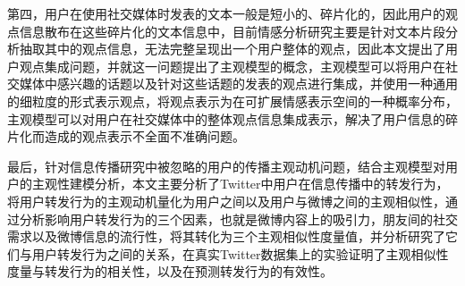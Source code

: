 第四，用户在使用社交媒体时发表的文本一般是短小的、碎片化的，因此用户的观点信息散布在这些碎片化的文本信息中，目前情感分析研究主要是针对文本片段分析抽取其中的观点信息，无法完整呈现出一个用户整体的观点，因此本文提出了用户观点集成问题，并就这一问题提出了主观模型的概念，主观模型可以将用户在社交媒体中感兴趣的话题以及针对这些话题的发表的观点进行集成，并使用一种通用的细粒度的形式表示观点，将观点表示为在可扩展情感表示空间的一种概率分布，主观模型可以对用户在社交媒体中的整体观点信息集成表示，解决了用户信息的碎片化而造成的观点表示不全面不准确问题。

最后，针对信息传播研究中被忽略的用户的传播主观动机问题，结合主观模型对用户的主观性建模分析，本文主要分析了Twitter中用户在信息传播中的转发行为，将用户转发行为的主观动机量化为用户之间以及用户与微博之间的主观相似性，通过分析影响用户转发行为的三个因素，也就是微博内容上的吸引力，朋友间的社交需求以及微博信息的流行性，将其转化为三个主观相似性度量值，并分析研究了它们与用户转发行为之间的关系，在真实Twitter数据集上的实验证明了主观相似性度量与转发行为的相关性，以及在预测转发行为的有效性。

